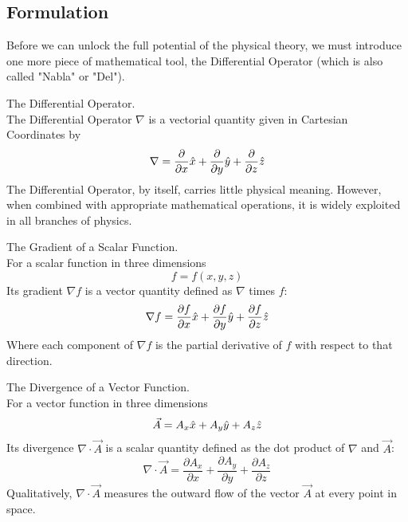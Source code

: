 \documentclass[11pt]{article}
\theoremstyle{gangnamstyle}{\newtheorem{definition}{Definition}[]}
\theoremstyle{gangnamstyle}{\newtheorem{example}{Example}[]}
\theoremstyle{gangnamstyle}{\newtheorem{problem}{Problem}[]}
\begin{document}
\subsection{Formulation}

Before we can unlock the full potential of the physical theory, we must introduce one more piece of mathematical tool, the Differential Operator (which is also called "Nabla" or "Del"). 

\begin{definition}
The Differential Operator. \\
The Differential Operator $\nabla$ is a vectorial quantity given in Cartesian Coordinates by
\begin{equation}
\nabla = \frac{\partial}{\partial x}\Hat{x} + \frac{\partial}{\partial y}\Hat{y} + \frac{\partial}{\partial z}\Hat{z}
\end{equation}
The Differential Operator, by itself, carries little physical meaning. However, when combined with appropriate mathematical operations, it is widely exploited in all branches of physics. 
\end{definition}

\begin{definition}
The Gradient of a Scalar Function. \\
For a scalar function in three dimensions 
\begin{equation}
f = f(x, y, z)
\end{equation}
Its gradient $\nabla f$ is a vector quantity defined as $\nabla$ times $f$: 
\begin{equation}
\nabla f = \frac{\partial f}{\partial x}\Hat{x} + \frac{\partial f}{\partial y}\Hat{y} + \frac{\partial f}{\partial z}\Hat{z}
\end{equation}
Where each component of $\nabla f$ is the partial derivative of $f$ with respect to that direction. 
\end{definition}

\begin{definition}
The Divergence of a Vector Function. \\
For a vector function in three dimensions
\begin{equation}
\Vec{A} = A_x\Hat{x} + A_y\Hat{y} + A_z\Hat{z}
\end{equation}
Its divergence $\nabla \cdot \Vec{A}$ is a scalar quantity defined as the dot product of $\nabla$ and $\Vec{A}$: 
\begin{equation}
\nabla \cdot \Vec{A} = \frac{\partial A_x}{\partial x} + \frac{\partial A_y}{\partial y} + \frac{\partial A_z}{\partial z}
\end{equation}
Qualitatively, $\nabla \cdot \Vec{A}$ measures the outward flow of the vector $\Vec{A}$ at every point in space. 
\end{definition}
\end{document}
